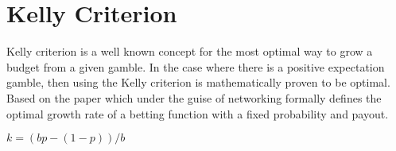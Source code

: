 \documentclass[12pt]{article}
\begin{document}
\section{Kelly Criterion}

Kelly criterion is a well known concept for the most optimal way to grow a budget from a given
gamble. In the case where there is a positive expectation gamble, then using the Kelly criterion
is mathematically proven to be optimal. Based on the paper which under the guise of networking
formally defines the optimal growth rate of a betting function with a fixed probability and
payout.\newline

\( k = (bp - (1 - p)) / b \)
\end{document}
